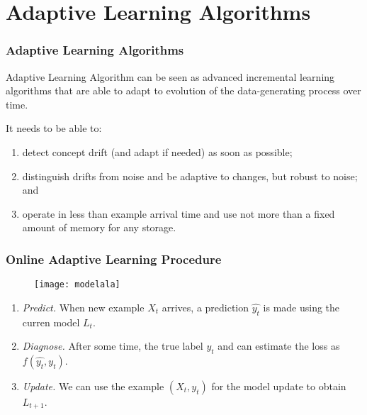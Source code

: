 \section{Adaptive Learning Algorithms}

\begin{frame}
\frametitle{Adaptive Learning Algorithms}

\begin{de}{Adaptive Learning Algorithm}
can be seen as advanced incremental learning
algorithms that are able to adapt to evolution of the data-generating process over time.
\end{de}

It needs to be able to:
\begin{enumerate}

\item detect concept drift (and adapt if needed) as soon as possible;

\item distinguish drifts from noise and be adaptive to changes, but robust to noise; and

\item operate in less than example arrival time and use not more than a fixed amount of
memory for any storage.
\end{enumerate}


\end{frame}

\begin{frame}
\frametitle{Online Adaptive Learning Procedure}

\begin{figure}
	\texttt{[image: modelala]}
\end{figure}

\begin{enumerate}
	\item \textit{Predict.} When new example $X_t$ arrives, a prediction $\hat{y_t}$ is made using the curren model $L_t$.
	\item<2-3> \textit{Diagnose.} After some time, the true label $y_t$ and can estimate the loss as $f(\hat{y_t}, y_t)$.
	\item<3> \textit{Update.} We can use the example $(X_t,y_t)$ for the model update to obtain $L_{t+1}$.
\end{enumerate}

\end{frame}


